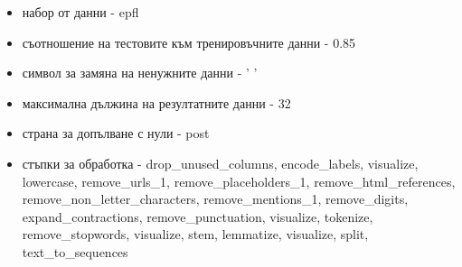 \documentclass{article}
\begin{document}
\begin{itemize}
\begin{itemize}
\item набор от данни - epfl
\item съотношение на тестовите към тренировъчните данни - 0.85
\item символ за замяна на ненужните данни - ' '
\item максимална дължина на резултатните данни - 32
\item страна за допълване с нули - post
\item стъпки за обработка - drop\_unused\_columns, encode\_labels, visualize, lowercase, remove\_urls\_1,
remove\_placeholders\_1, remove\_html\_references, remove\_non\_letter\_characters, remove\_mentions\_1,
remove\_digits, expand\_contractions, remove\_punctuation, visualize, tokenize, remove\_stopwords, visualize,
stem, lemmatize, visualize, split, text\_to\_sequences
\end{itemize}


\end{itemize}
\end{document}
